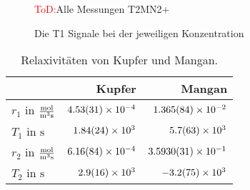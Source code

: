 \begin{figure}[H]
    \centering
    
    \caption{\textcolor{red}{ToD:}Alle Messungen T2MN2+}
    \label{fig:T2M}
\end{figure}

\begin{figure}[H]
    \centering
    
    \caption{Die T1 Signale bei der jeweiligen Konzentration}
    \label{fig:T1Signalkontrast}
\end{figure}

\begin{table}[H]
    \centering
    \caption{Relaxivitäten von Kupfer und Mangan.}
    \begin{tabular}{|l||r|r|} \hline
            & Kupfer    & Mangan    \\    \hline \hline
        $r_{1}$ in $\si{\frac{\mol}{\metre \cubed \second}}$    & $\SI{4.53 \pm 0.31e-4}{}$   & $\SI{1.365 \pm 0.084e-2}{}$    \\    \hline
        $T_{1}$ in $\si{\second}$                               & $\SI{1.84 \pm 0.24e3}{}$    & $\SI{5.7    \pm 6.3e3}{}$       \\    \hline
        $r_{2}$ in $\si{\frac{\mol}{\metre \cubed \second}}$    & $\SI{6.16 \pm 0.84e-4}{}$   & $\SI{3.593  \pm 0.0031e-1}{}$   \\    \hline
        $T_{2}$ in $\si{\second}$                               & $\SI{2.9  \pm 1.6e3}{}$     & $\SI{-3.2   \pm 7.5e3}{}$       \\    \hline
    \end{tabular} 
    \label{tab:Relaxivitat} 
\end{table}
    

